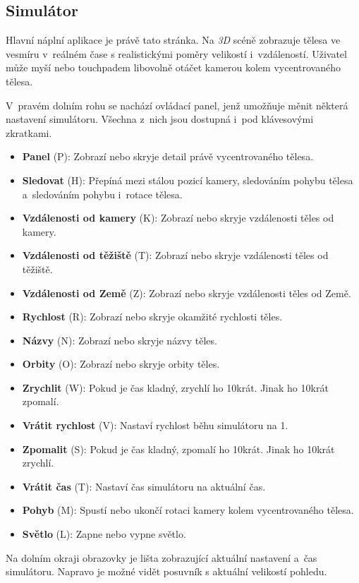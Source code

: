 \documentclass[a4paper,12pt]{article}
\begin{document}
\subsection{Simulátor}

Hlavní náplní aplikace je právě tato stránka. Na \textit{3D} scéně zobrazuje tělesa ve vesmíru v~reálném čase s realistickými poměry velikostí i~vzdáleností. Uživatel může myší nebo touchpadem libovolně otáčet kamerou kolem vycentrovaného tělesa.

V~pravém dolním rohu se nachází ovládací panel, jenž umožňuje měnit některá nastavení simulátoru. Všechna z~nich jsou dostupná i~pod klávesovými zkratkami.

\begin{itemize}
\item \textbf{Panel} (P): Zobrazí nebo skryje detail právě vycentrovaného tělesa.
\item \textbf{Sledovat} (H): Přepíná mezi stálou pozicí kamery, sledováním pohybu tělesa a~sledováním pohybu i~rotace tělesa.
\item \textbf{Vzdálenosti od kamery} (K): Zobrazí nebo skryje vzdálenosti těles od kamery.
\item \textbf{Vzdálenosti od těžiště} (T): Zobrazí nebo skryje vzdálenosti těles od těžiště.
\item \textbf{Vzdálenosti od Země} (Z): Zobrazí nebo skryje vzdálenosti těles od Země.
\item \textbf{Rychlost} (R): Zobrazí nebo skryje okamžité rychlosti těles.
\item \textbf{Názvy} (N): Zobrazí nebo skryje názvy těles.
\item \textbf{Orbity} (O): Zobrazí nebo skryje orbity těles.
\item \textbf{Zrychlit} (W): Pokud je čas kladný, zrychlí ho 10krát. Jinak ho 10krát zpomalí.
\item \textbf{Vrátit rychlost} (V): Nastaví rychlost běhu simulátoru na 1.
\item \textbf{Zpomalit} (S): Pokud je čas kladný, zpomalí ho 10krát. Jinak ho 10krát zrychlí.
\item \textbf{Vrátit čas} (T): Nastaví čas simulátoru na aktuální čas.
\item \textbf{Pohyb} (M): Spustí nebo ukončí rotaci kamery kolem vycentrovaného tělesa.
\item \textbf{Světlo} (L): Zapne nebo vypne světlo.
\end{itemize}

Na dolním okraji obrazovky je lišta zobrazující aktuální nastavení a~čas simulátoru. Napravo je možné vidět posuvník s aktuální velikostí pohledu.
\end{document}
